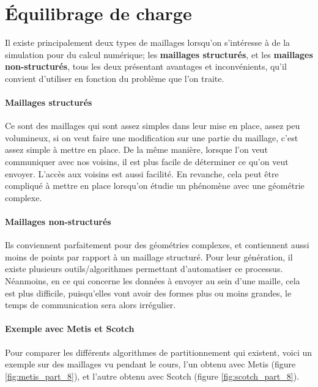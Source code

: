 \documentclass[a4paper,11pt]{article}
\begin{document}
\newpage


\section{Équilibrage de charge}
\noindent Il existe principalement deux types de maillages lorsqu'on s'intéresse à de la simulation pour du calcul numérique; les \textbf{maillages structurés}, et les \textbf{maillages non-structurés}, tous les deux présentant avantages et inconvénients, qu'il convient d'utiliser en fonction du problème que l'on traite.

\paragraph{Maillages structurés} 
Ce sont des maillages qui sont assez simples dans leur mise en place, assez peu volumineux, si on veut faire une modification sur une partie du maillage, c'est assez simple à mettre en place. De la même manière, lorsque l'on veut communiquer avec nos voisins, il est plus facile de déterminer ce qu'on veut envoyer.
L'accès aux voisins est aussi facilité. En revanche, cela peut être compliqué à mettre en place lorsqu'on étudie un phénomène avec une géométrie complexe.

\paragraph{Maillages non-structurés} 
Ils conviennent parfaitement pour des géométries complexes, et contiennent aussi moins de points par rapport à un maillage structuré. Pour leur génération, il existe plusieurs outils/algorithmes permettant d'automatiser ce processus. Néanmoins, en ce qui concerne les données à envoyer au sein d'une maille, cela est plus difficile, puisqu'elles vont avoir des formes plus ou moins grandes, le temps de communication sera alors irrégulier.

\paragraph{Exemple avec Metis et Scotch}
Pour comparer les différents algorithmes de partitionnement qui existent, voici un exemple sur des maillages vu pendant le cours, l'un obtenu avec Metis (figure \ref{fig:metis_part_8}), et l'autre obtenu avec Scotch (figure \ref{fig:scotch_part_8}).
\end{document}
